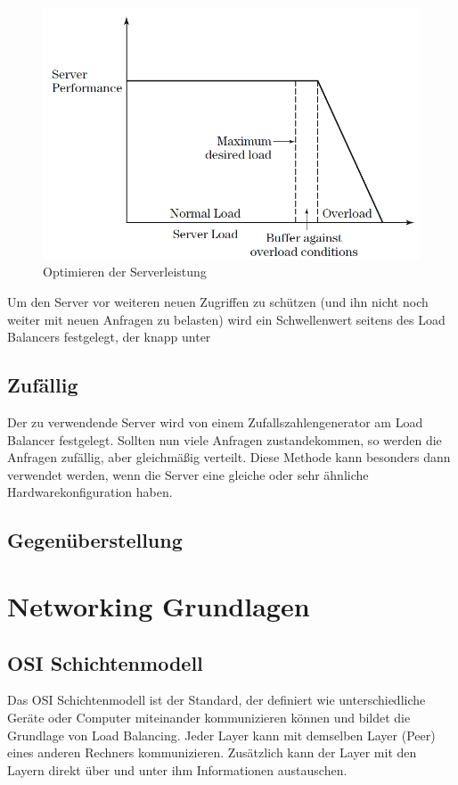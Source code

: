 \begin{figure}[!h]
	\begin{center}
		\includegraphics[width=0.5\linewidth]{images/LoadBalancing_LoadThreshold.png}
		\caption{Optimieren der Serverleistung \cite{LoadBalancing2}}
		\label{ServerTheshold}
	\end{center}
\end{figure}

Um den Server vor weiteren neuen Zugriffen zu schützen (und ihn nicht noch weiter mit neuen Anfragen zu belasten) wird ein Schwellenwert seitens des Load Balancers festgelegt, der knapp unter 

\subsection{Zufällig}
\label{sec:Zufällig}
Der zu verwendende Server wird von einem Zufallszahlengenerator am Load Balancer festgelegt. Sollten nun viele Anfragen zustandekommen, so werden die Anfragen zufällig, aber gleichmäßig verteilt.
Diese Methode kann besonders dann verwendet werden, wenn die Server eine gleiche oder sehr ähnliche Hardwarekonfiguration haben. \cite{WeightedLoadBalancingGrafik}

\subsection{Gegenüberstellung}
\label{sec:Gegenüberstellung}


\section{Networking Grundlagen}
\label{sec:Networking Grundlagen}

\subsection{OSI Schichtenmodell}
\label{sec:OSI Schichtenmodell}
Das OSI Schichtenmodell ist der Standard, der definiert wie unterschiedliche Geräte oder Computer miteinander kommunizieren können und bildet die Grundlage von Load Balancing. Jeder Layer kann mit demselben Layer (Peer) eines anderen Rechners kommunizieren. Zusätzlich kann der Layer mit den Layern direkt über und unter ihm Informationen austauschen. \cite{LoadBalancing2}

